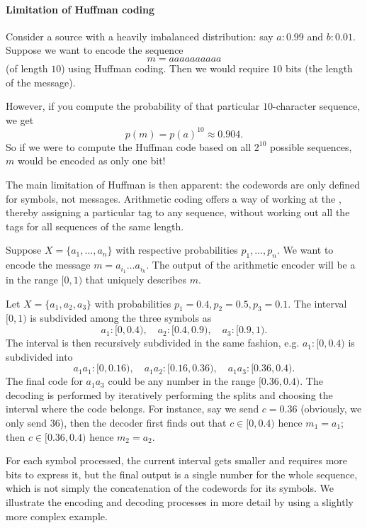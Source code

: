 \documentclass[a4paper, 11pt, openany]{book}
\begin{document}
\paragraph{Limitation of Huffman coding} Consider a source with a heavily imbalanced distribution: say $a :0.99$ and $b: 0.01$. Suppose we want to encode the sequence
\[
    m = aaaaaaaaaa
\]
(of length $10$) using Huffman coding. Then we would require $10$ bits (the length of the message).

However, if you compute the probability of that particular $10$-character sequence, we get
\[
    p(m) = p(a)^{10} \approx 0.904.
\]
So if we were to compute the Huffman code based on all $2^{10}$ possible sequences, $m$ would be encoded as only one bit!

The main limitation of Huffman is then apparent: the codewords are only defined for symbols, not messages. Arithmetic coding offers a way of working at the , thereby assigning a particular tag to any sequence, without working out all the tags for all sequences of the same length.

Suppose $X = \{a_1, \dots, a_n\}$ with respective probabilities $p_1, \dots, p_n$. We want to encode the message $m = a_{i_1} \dots a_{i_k}$. The output of the arithmetic encoder will be a  in the range $[0,1)$ that uniquely describes $m$.

\begin{example} \label{example:arithmetic}
Let $X = \{a_1, a_2, a_3\}$ with probabilities $p_1 = 0.4, p_2 = 0.5, p_3 = 0.1$. The interval $[0,1)$ is subdivided among the three symbols as
\[
    a_1 : [0, 0.4), \quad a_2 : [0.4, 0.9), \quad a_3 : [0.9, 1).
\]
The interval is then recursively subdivided in the same fashion, e.g. $a_1 : [0, 0.4)$ is subdivided into
\[
    a_1a_1 : [0, 0.16), \quad a_1a_2 : [0.16, 0.36), \quad a_1a_3 : [0.36, 0.4).
\]
The final code for $a_1a_3$ could be any number in the range $[0.36, 0.4)$. The decoding is performed by iteratively performing the splits and choosing the interval where the code belongs. For instance, say we send $c = 0.36$ (obviously, we only send $36$), then the decoder first finds out that $c \in [0, 0.4)$ hence $m_1 = a_1$; then $c \in [0.36, 0.4)$ hence $m_2 = a_2$.
\end{example}




For each symbol processed, the current interval gets smaller and requires more bits to express it, but the final output is a single number for the whole sequence, which is not simply the concatenation of the codewords for its symbols. We illustrate the encoding and decoding processes in more detail by using a slightly more complex example.
\end{document}
